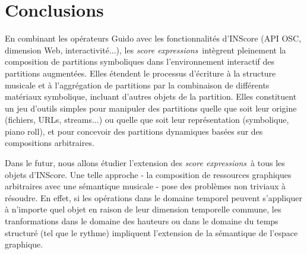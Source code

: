 \documentclass{article}
\newcommand{\sExprs}{\emph{score expressions}}
\begin{document}
\section{Conclusions}

En combinant les opérateurs Guido avec les fonctionnalités d'INScore (API OSC, dimension Web, interactivité...), les \sExprs\ intègrent pleinement la composition de partitions symboliques dans l'environnement interactif des partitions augmentées. Elles étendent le processus d'écriture à la structure musicale et à l'aggrégation de partitions par la combinaison de différents matériaux symbolique, incluant d'autres objets de la partition. Elles constituent un jeu d'outils simples pour manipuler des partitions quelle que soit leur origine (fichiers, URLs, streams...) ou quelle que soit leur représentation (symbolique, piano roll), et pour concevoir des partitions dynamiques basées sur des compositions arbitraires.

Dans le futur, nous allons étudier l'extension des \sExprs\ à tous les objets d'INScore. Une telle approche - la composition de ressources graphiques arbitraires avec une sémantique musicale - pose des problèmes non triviaux à résoudre. En effet, si les opérations dans le domaine temporel peuvent s'appliquer à n'importe quel objet en raison de leur dimension temporelle commune, les tranformations dans le domaine des hauteurs ou dans le domaine du temps structuré (tel que le rythme) impliquent l'extension de la sémantique de l'espace graphique.

\balance


\end{document}
